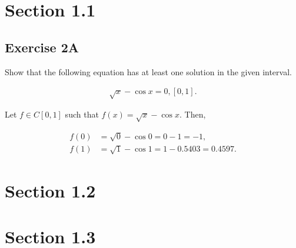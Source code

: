 \documentclass[a4paper, 10pt]{article}
\newenvironment{answer}[1][Answer]{\begin{trivlist}
\item[\hskip\labelsep{\textit{#1.}}]}{\end{trivlist}}
\begin{document}
\raggedcolumns{}
\tableofcontents

\section{Section 1.1}


\subsection{Exercise 2A}

Show that the following equation has at least one solution in the given interval.

\begin{align*}
	\sqrt{x} - \cos{x} = 0, \left[ 0,1 \right].
\end{align*}

\begin{answer}
	Let $f\in C[0,1]$ such that $f(x) = \sqrt{x} - \cos{x}$. Then,

	\begin{align*}
		f(0) &= \sqrt{0} - \cos{0} = 0 - 1 = -1,\\
		f(1) &= \sqrt{1} - \cos{1} = 1 - 0.5403 = 0.4597.  
	\end{align*}
\end{answer}

\section{Section 1.2}


\section{Section 1.3}

\end{document}

